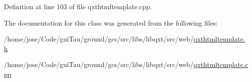 Definition at line 103 of file qxthtmltemplate.\-cpp.



The documentation for this class was generated from the following files\-:\begin{DoxyCompactItemize}
\item 
/home/jose/\-Code/gui\-Tau/ground/gcs/src/libs/libqxt/src/web/\hyperlink{qxthtmltemplate_8h}{qxthtmltemplate.\-h}\item 
/home/jose/\-Code/gui\-Tau/ground/gcs/src/libs/libqxt/src/web/\hyperlink{qxthtmltemplate_8cpp}{qxthtmltemplate.\-cpp}\end{DoxyCompactItemize}
